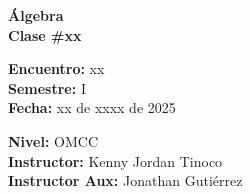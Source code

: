 \begin{center} \textbf
{
    \Large Álgebra \\ \vspace{2mm}Clase \#xx
}
\end{center}

\begin{multicols}{2}
{
    \textbf{Encuentro:} xx\\
    \textbf{Semestre:} I\\
    \textbf{Fecha:} xx de xxxx de 2025\\
    \begin{flushright}
        \textbf{Nivel:} OMCC\\
        \textbf{Instructor:} Kenny Jordan Tinoco\\
        \textbf{Instructor Aux:} Jonathan Gutiérrez
    \end{flushright}
}
\end{multicols}

\thispagestyle{first-page-style}
